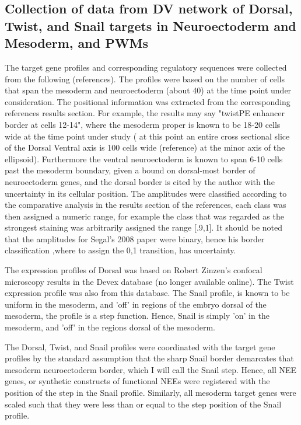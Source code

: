 \subsection{Collection of data from DV network of Dorsal, Twist, and Snail targets in Neuroectoderm and Mesoderm, and PWMs}\label{DVdata}
The target gene profiles and corresponding regulatory sequences were collected from the following (references)\cite{Jiang1993741}\cite{pmid8453668}\cite{pmid1655572}.  The profiles were based on the number of cells that span the mesoderm and neuroectoderm (about 40) at the time point under consideration.  The positional information was extracted from the corresponding references results section.  For example, the results may say "twistPE enhancer border at cells 12-14", where the mesoderm proper is known to be 18-20 cells wide at the time point under study ( at this point an entire cross sectional slice of the Dorsal Ventral axis is 100 cells wide (reference) at the minor axis of the ellipsoid).  Furthermore the ventral neuroectoderm is known to span 6-10 cells past the mesoderm boundary, given a bound on dorsal-most border of neuroectoderm genes, and the dorsal border is cited by the author with the uncertainty in its cellular position.  The amplitudes were classified according to the comparative analysis in the results section of the references, each class was then assigned a numeric range, for example the class that was regarded as the strongest staining was arbitrarily assigned the range [.9,1].  It should be noted that the amplitudes for Segal's 2008 paper were binary, hence his border classification ,where to assign the 0,1 transition, has uncertainty.  

The expression profiles of Dorsal was based on Robert Zinzen's confocal microscopy results in the Devex database (no longer available online).  The Twist expression profile was also from this database.  The Snail profile, is known to be uniform in the mesoderm, and 'off' in regions of the embryo dorsal of the mesoderm, the profile is a step function.  Hence, Snail is simply 'on' in the mesoderm, and 'off' in the regions dorsal of the mesoderm.  

The Dorsal, Twist, and Snail profiles were coordinated with the target gene profiles by the standard assumption that the sharp Snail border demarcates that mesoderm neuroectoderm border, which I will call the Snail step.  Hence, all NEE genes, or synthetic constructs of functional NEEs were registered with the position of the step in the Snail profile.  Similarly, all mesoderm target genes were scaled such that they were less than or equal to the step position of the Snail profile. 

